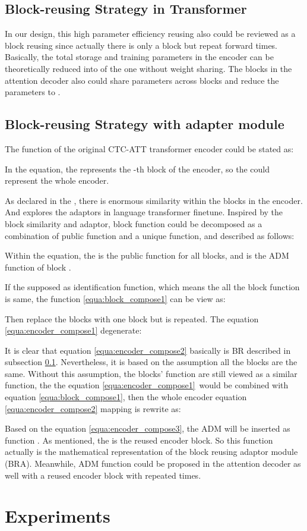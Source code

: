 \documentclass{INTERSPEECH2023}
\begin{document}
\subsection{Block-reusing Strategy in Transformer} \label{subsec:blockreuse}
In our design, this high parameter efficiency reusing also could be reviewed as a block reusing since actually there is only a block but repeat forward  times. Basically, the total storage and training parameters in the encoder can be theoretically reduced into  of the one without weight sharing. The blocks in the attention decoder also could share parameters across blocks and reduce the parameters to . 

\subsection{Block-reusing Strategy with adapter module}
The function of the original CTC-ATT transformer encoder could be stated as:

In the equation, the  represents the -th block of the encoder, so the  could represent the whole encoder.


As declared in the \cite{zhao2021non}, there is enormous similarity within the blocks in the encoder. And \cite{houlsby2019parameter} explores the adaptors in language transformer finetune. Inspired by the block similarity and adaptor, block function could be decomposed as a combination of public function and a unique function, and described as follows:

Within the equation, the  is the public function for all blocks, and  is the ADM function of block . 


If the  supposed as identification function, which means the all the block function is same, the function \ref{equa:block_compose1} can be view as:

Then replace the  blocks with one block but  is repeated. The equation \ref{equa:encoder_compose1} degenerate:

It is clear that equation \ref{equa:encoder_compose2} basically is BR described in subsection \ref{subsec:blockreuse}. Nevertheless, it is based on the assumption all the blocks are the same. Without this assumption, the blocks' function are still viewed as a similar function, the the equation \ref{equa:encoder_compose1}\ would be combined with equation \ref{equa:block_compose1}, then the whole encoder equation \ref{equa:encoder_compose2}  mapping is rewrite as:

Based on the equation \ref{equa:encoder_compose3}, the ADM will be inserted as function . As mentioned, the  is the reused encoder block. So this function actually is the mathematical representation of the block reusing adaptor module (BRA). Meanwhile, ADM function could be proposed in the attention decoder as well with a reused encoder block with repeated  times. \section{Experiments} \label{sec:Experiments}
\end{document}
